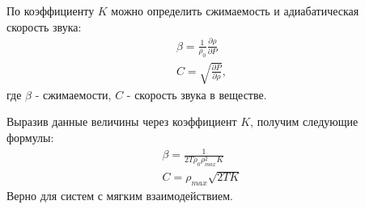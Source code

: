 \documentclass[pdf,hyperref={unicode}]{beamer}
\begin{document}
\begin{frame}
\begin{columns}
\begin{column}{0.6\linewidth}
\end{column}

\begin{column}{0.45\linewidth}
\tiny{
По коэффициенту $K$ можно определить сжимаемость и адиабатическая скорость звука:
\begin{equation}
\begin{aligned}
\beta = \frac{1}{\rho_0} \frac{\partial \rho}{\partial P} \\
C = \sqrt{\frac{\partial P}{\partial \rho}},
\end{aligned}
\label{eqCBeta}
\end{equation}
где $\beta$ - сжимаемости, $C$ - скорость звука в веществе.

Выразив данные величины через коэффициент $K$, получим следующие формулы:
\begin{equation}
\begin{aligned}
\beta = \frac{1}{2T\rho_0\rho_{max}^2K}\\
C = \rho_{max}\sqrt{2TK}
\end{aligned}
\label{eqCBetaK}
\end{equation}
Верно для систем с мягким взаимодействием. 
}
\end{column}

\end{columns}
\end{frame}







\end{document}
